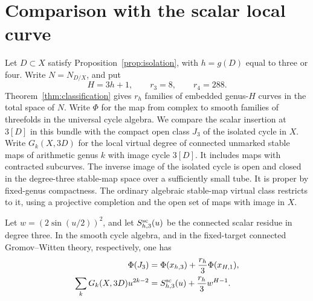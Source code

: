\section{Comparison with the scalar local curve}\label{sec:triplecomparison}

Let $D\subset X$ satisfy Proposition~\ref{prop:isolation}, with $h=g(D)$
equal to three or four. Write $N=N_{D/X}$, and put
\[
                 H=3h+1,\qquad r_3=8,\qquad r_4=288 .
\]
Theorem~\ref{thm:classification} gives $r_h$ families of embedded
genus-$H$ curves in the total space of $N$. Write $\Phi$ for the map from complex to smooth families of
threefolds in the universal cycle algebra. We compare the scalar
insertion at $3[D]$ in this bundle with the compact open class $J_3$
of the isolated cycle in $X$. Write $G_k(X,3D)$ for the local virtual
degree of connected unmarked stable maps of arithmetic genus $k$ with
image cycle $3[D]$. It includes maps with contracted subcurves.
The inverse image of the isolated cycle is open and closed
in the degree-three stable-map space over a sufficiently small tube.
It is proper by fixed-genus compactness. The ordinary algebraic
stable-map virtual class restricts to it, using a projective completion
and the open set of maps with image in $X$.

\begin{proposition}\label{prop:borel}
Let $w=(2\sin(u/2))^2$, and let $S^{\rm sc}_{h,3}(u)$ be the connected
scalar residue in degree three. In the smooth cycle algebra, and in the
fixed-target connected Gromov--Witten theory, respectively, one has
\begin{align}
 \Phi(J_3)&=\Phi(x_{h,3})+\frac{r_h}{3}\Phi(x_{H,1}),
           \label{eq:cubic-smooth-comparison}\\
 \sum_k G_k(X,3D)u^{2k-2}
     &=S^{\rm sc}_{h,3}(u)+\frac{r_h}{3}w^{H-1}.
           \label{eq:cubic-residue-comparison}
\end{align}
\end{proposition}

